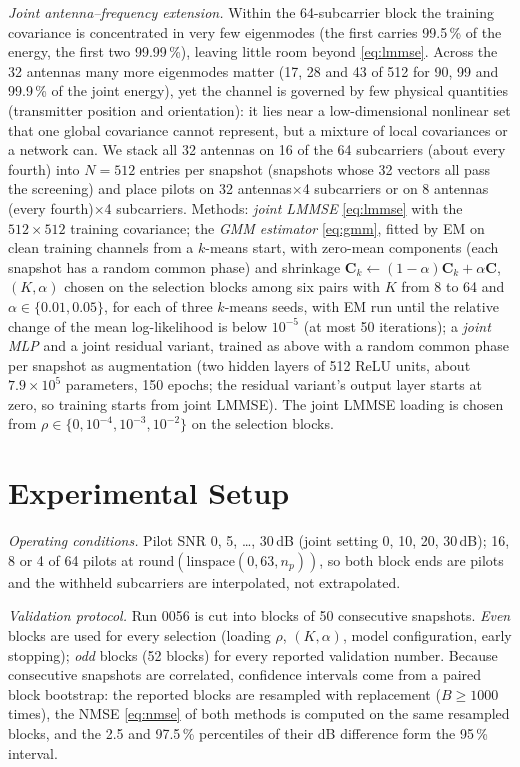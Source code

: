 \documentclass[conference]{IEEEtran}
\newcommand{\mC}{\bm{C}}
\begin{document}
\emph{Joint antenna--frequency extension.} Within the 64-subcarrier block the training covariance is
concentrated in very few eigenmodes (the first carries 99.5\,\% of the energy, the first two
99.99\,\%), leaving little room beyond \eqref{eq:lmmse}. Across the 32 antennas many more eigenmodes
matter (17, 28 and 43 of 512 for 90, 99 and 99.9\,\% of the joint energy), yet the channel is governed by few physical quantities (transmitter position and orientation): it
lies near a low-dimensional nonlinear set that one global covariance cannot represent, but a mixture of
local covariances or a network can. We stack all 32 antennas on 16 of the 64 subcarriers (about every
fourth) into $N=512$ entries per snapshot (snapshots whose 32 vectors all pass the screening) and place
pilots on 32 antennas$\times$4 subcarriers or on 8 antennas (every fourth)$\times$4 subcarriers. Methods:
\emph{joint LMMSE} \eqref{eq:lmmse} with the $512\times512$ training covariance; the \emph{GMM estimator}
\eqref{eq:gmm}, fitted by EM on clean training channels from a $k$-means start, with zero-mean components
(each snapshot has a random common phase) and shrinkage $\mC_k\leftarrow(1-\alpha)\mC_k+\alpha\mC$,
$(K,\alpha)$ chosen on the selection blocks among six pairs with $K$ from 8 to 64 and
$\alpha\in\{0.01,0.05\}$, for each of three $k$-means seeds, with EM run until the relative change of the mean
log-likelihood is below $10^{-5}$ (at most 50 iterations); a \emph{joint MLP} and a joint residual
variant, trained as above with a random common phase per snapshot as augmentation
(two hidden layers of 512 ReLU units, about $7.9\times10^5$ parameters, 150 epochs; the residual
variant's output layer starts at zero, so training starts from joint LMMSE). The joint LMMSE loading is
chosen from $\rho\in\{0,10^{-4},10^{-3},10^{-2}\}$ on the selection blocks.

\section{Experimental Setup}
\label{sec:setup}
\emph{Operating conditions.} Pilot SNR 0, 5, \dots, 30\,dB (joint setting 0, 10, 20, 30\,dB); 16, 8 or 4
of 64 pilots at $\mathrm{round}(\mathrm{linspace}(0,63,n_p))$, so both block ends are pilots and the
withheld subcarriers are interpolated, not extrapolated.

\emph{Validation protocol.} Run 0056 is cut into blocks of 50 consecutive snapshots. \emph{Even} blocks
are used for every selection (loading $\rho$, $(K,\alpha)$, model configuration, early stopping);
\emph{odd} blocks (52 blocks) for every reported validation number. Because consecutive snapshots are
correlated, confidence intervals come from a paired block bootstrap: the reported blocks are resampled
with replacement ($B\ge1000$ times), the NMSE \eqref{eq:nmse} of both methods is computed on the same resampled
blocks, and the 2.5 and 97.5\,\% percentiles of their dB difference form the 95\,\% interval.
\end{document}

